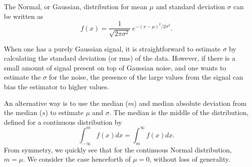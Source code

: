 %
%
%
%
\label{app-madfm}

The Normal, or Gaussian, distribution for mean $\mu$ and standard
deviation $\sigma$ can be written as 
\[ 
f(x) = \frac{1}{\sqrt{2\pi\sigma^2}}\ e^{-(x-\mu)^2/2\sigma^2}.
 \]

When one has a purely Gaussian signal, it is straightforward to
estimate $\sigma$ by calculating the standard deviation (or rms) of
the data. However, if there is a small amount of signal present on top
of Gaussian noise, and one wants to estimate the $\sigma$ for the
noise, the presence of the large values from the signal can bias the
estimator to higher values.

An alternative way is to use the median ($m$) and median absolute
deviation from the median ($s$) to estimate $\mu$ and $\sigma$. The
median is the middle of the distribution, defined for a continuous
distribution by
\[
\int_{-\infty}^{m} f(x) dx = \int_{m}^{\infty} f(x) dx.
\]
From symmetry, we quickly see that for the continuous Normal
distribution, $m=\mu$. We consider the case henceforth of $\mu=0$,
without loss of generality.

